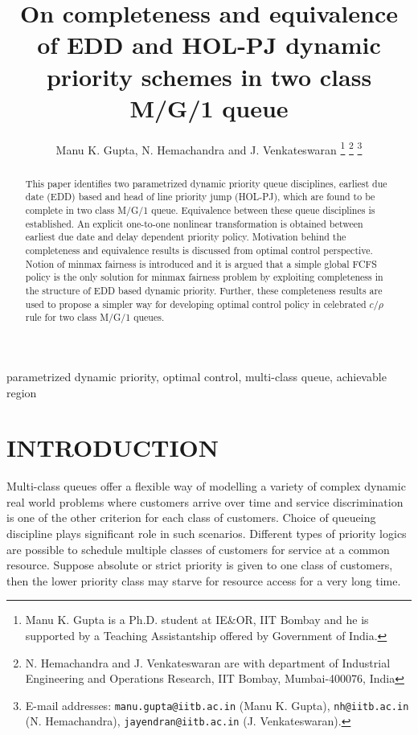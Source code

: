 \documentclass[letterpaper, 10 pt, conference]{ieeeconf}  %
\title{\LARGE \bf
On completeness and equivalence of EDD and HOL-PJ dynamic priority schemes in two class M/G/1 queue
}
\author{Manu K. Gupta, N. Hemachandra and J. Venkateswaran%
\thanks{Manu K. Gupta is a
Ph.D. student at IE$\&$OR, IIT Bombay and he
is supported by a Teaching Assistantship offered by
Government of India.}%
\thanks{N. Hemachandra and J. Venkateswaran are with department of Industrial Engineering and Operations Research, IIT Bombay, Mumbai-400076, India} 
\thanks{E-mail addresses: {\tt\small manu.gupta@iitb.ac.in} (Manu K. Gupta), 
     {\tt\small nh@iitb.ac.in} (N. Hemachandra), {\tt\small jayendran@iitb.ac.in} (J. Venkateswaran). }%
}
\begin{document}
\maketitle
\thispagestyle{empty}
\pagestyle{empty}


\begin{abstract}
This paper identifies two parametrized dynamic priority queue disciplines, earliest due date (EDD) based and head of line priority jump (HOL-PJ), which are found to be complete in two class M/G/1 queue. Equivalence between these queue disciplines is established. An explicit one-to-one nonlinear transformation is obtained between earliest due date and delay dependent priority policy. Motivation behind the completeness and equivalence results is discussed from optimal control perspective. Notion of minmax fairness is introduced and it is argued that a simple global FCFS policy is the only solution for minmax fairness problem by exploiting completeness in the structure of EDD based dynamic priority. Further, these completeness results are used to propose a simpler way for developing optimal control policy in celebrated $c/\rho$ rule for two class M/G/1 queues.
\end{abstract}
\begin{keywords}
parametrized dynamic priority, optimal control, multi-class queue, achievable region 
\end{keywords}
\section{INTRODUCTION}
Multi-class queues offer a flexible way of modelling a variety of complex dynamic real world problems where customers arrive over time and service discrimination is one of the other criterion for each class of customers. Choice of queueing discipline plays significant role in such scenarios. Different types of priority logics are possible to schedule multiple classes of customers for service at a common resource.
Suppose absolute or strict priority is given to one class of
customers, then the lower priority class may starve for resource
access for a very long time.
\end{document}
